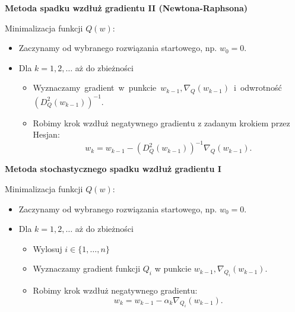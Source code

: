 \begin{center}
\textbf{Metoda spadku wzdłuż gradientu II (Newtona-Raphsona)}
\end{center}
Minimalizacja funkcji $Q(w)$:
\begin{itemize}
\item Zaczynamy od wybranego rozwiązania startowego, np. $w_{0} = 0$.
\item Dla $k = 1, 2, \dots$ aż do zbieżności
	\begin{itemize}
	\item Wyznaczamy~gradient~w~punkcie~$w_{k-1}, \nabla_{Q}(w_{k-1})$~i~odwrotność~$(D_{Q}^{2}(w_{k-1}))^{-1}$.
	\item Robimy krok wzdłuż negatywnego gradientu z zadanym krokiem przez Hesjan: 
	\begin{equation}\label{NJU-rap}
	 w_{k} = w_{k-1} - (D_{Q}^{2}(w_{k-1}))^{-1}\nabla_{Q}(w_{k-1}). 
	 \end{equation}	
	\end{itemize}
\end{itemize}
\begin{center}
\textbf{Metoda stochastycznego spadku wzdłuż gradientu I}
\end{center}
Minimalizacja funkcji $Q(w)$:
\begin{itemize}
\item Zaczynamy od wybranego rozwiązania startowego, np. $w_{0} = 0$.
\item Dla $k = 1, 2, \dots$ aż do zbieżności
	\begin{itemize}
	\item Wylosuj $i \in \{1,\dots,n\}$
	\item Wyznaczamy gradient funkcji $Q_{i}$ w punkcie $w_{k-1}, \nabla_{Q_{i}}(w_{k-1})$.
	\item Robimy krok wzdłuż negatywnego gradientu: 
	\begin{equation}\label{sgdrownanie}
	 w_{k} = w_{k-1} - \alpha_{k}\nabla_{Q_{i}}(w_{k-1}).
	  \end{equation}
	\end{itemize}
\end{itemize}

